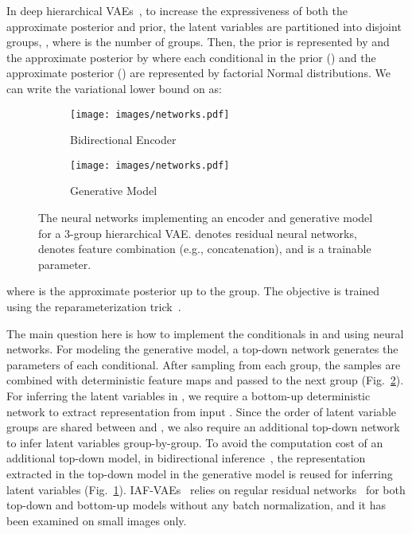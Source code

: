 \documentclass{article}
\begin{document}
In deep hierarchical VAEs~\cite{gregor2015draw, ranganath16hierarchical, kingma2016improved, sonderby2016ladder, klushyn19hierarchicalprior}, to increase the expressiveness of both the approximate posterior and prior, the latent variables are partitioned into disjoint groups, , where  is the number of groups. Then, the prior is represented by  and the approximate posterior by  where each conditional in the prior () and the approximate posterior () are represented by factorial Normal distributions. We can write the variational lower bound  on  as:
\begin{wrapfigure}{r}{6.0cm}
\vspace{-0.6cm}
\hspace{-0.2cm}
\begin{subfigure}[b]{.25\textwidth}
\centering
    \setlength{\belowcaptionskip}{0pt}
\texttt{[image: images/networks.pdf]}
    \caption{\small Bidirectional Encoder}
    \label{fig:encoder_net}
\end{subfigure}\begin{subfigure}[b]{.19\textwidth}
\centering
    \setlength{\belowcaptionskip}{0pt}
\texttt{[image: images/networks.pdf]}
    \caption{Generative Model}
    \label{fig:generative_net}
\end{subfigure}
\caption{The neural networks implementing an encoder  and generative model  for a 3-group hierarchical VAE. 
 denotes residual neural networks, \raisebox{-3pt}{\protect\tikz \protect\node [draw,scale=0.6,circle,thick]{+};} denotes feature combination (e.g., concatenation), and  is a trainable parameter.}
\label{fig:model}
\vspace{-0.6cm}
\end{wrapfigure}
where  is the approximate posterior up to the  group. The objective is trained using the reparameterization trick~\cite{kingma2014vae, rezende2014stochastic}. 

The main question here is how to implement the conditionals in  and  using neural networks. For modeling the generative model, a top-down network generates the parameters of each conditional. After sampling from each group, the samples are combined with deterministic feature maps and passed to the next group (Fig.~\ref{fig:generative_net}). For inferring the latent variables in , we require a bottom-up deterministic network to extract representation from input . Since the order of latent variable groups are shared between  and , we also require an additional top-down network to infer latent variables group-by-group. To avoid the computation cost of an additional top-down model, in bidirectional inference~\cite{kingma2016improved}, the representation extracted in the top-down model in the generative model is reused for inferring latent variables (Fig.~\ref{fig:encoder_net}). IAF-VAEs~\cite{kingma2016improved} relies on regular residual networks~\cite{he2016deep} for both top-down and bottom-up models without any batch normalization, and it has been examined on small images only.
\end{document}

